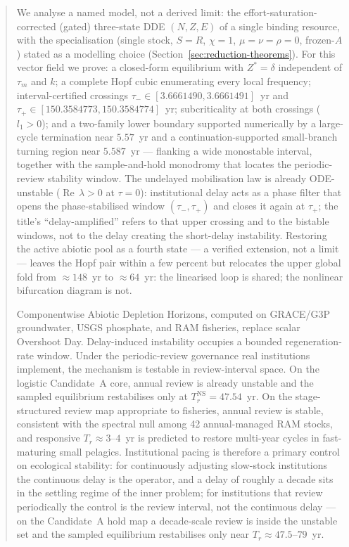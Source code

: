 \documentclass[11pt]{article}
\theoremstyle{definition}
\begin{document}
\begin{abstract}
We analyse a named model, not a derived limit: the effort-saturation-corrected (gated) three-state DDE $(N,Z,E)$ of a single binding resource, with the specialisation (single stock, $S=R$, $\chi=1$, $\mu=\nu=\rho=0$, frozen-$A$) stated as a modelling choice (Section~\ref{sec:reduction-theorems}). For this vector field we prove: a closed-form equilibrium with $Z^*=\delta$ independent of $\tau_m$ and $k$; a complete Hopf cubic enumerating every local frequency; interval-certified crossings $\tau_-\in[3.6661490,3.6661491]$~yr and $\tau_+\in[150.3584773,150.3584774]$~yr; subcriticality at both crossings ($l_1>0$); and a two-family lower boundary supported numerically by a large-cycle termination near $5.57$~yr and a continuation-supported small-branch turning region near $5.587$~yr --- flanking a wide monostable interval, together with the sample-and-hold monodromy that locates the periodic-review stability window. The undelayed mobilisation law is already ODE-unstable ($\operatorname{Re}\,\lambda>0$ at $\tau=0$): institutional delay acts as a phase filter that opens the phase-stabilised window $(\tau_-,\tau_+)$ and closes it again at $\tau_+$; the title's ``delay-amplified'' refers to that upper crossing and to the bistable windows, not to the delay creating the short-delay instability. Restoring the active abiotic pool as a fourth state --- a verified extension, not a limit --- leaves the Hopf pair within a few percent but relocates the upper global fold from $\approx 148$~yr to $\approx 64$~yr: the linearised loop is shared; the nonlinear bifurcation diagram is not.

Componentwise Abiotic Depletion Horizons, computed on GRACE/G3P groundwater, USGS phosphate, and RAM fisheries, replace scalar Overshoot Day. Delay-induced instability occupies a bounded regeneration-rate window. Under the periodic-review governance real institutions implement, the mechanism is testable in review-interval space. On the logistic Candidate~A core, annual review is already unstable and the sampled equilibrium restabilises only at $T_r^{\mathrm{NS}}=47.54$~yr. On the stage-structured review map appropriate to fisheries, annual review is stable, consistent with the spectral null among 42 annual-managed RAM stocks, and responsive $T_r\approx 3$--$4$~yr is predicted to restore multi-year cycles in fast-maturing small pelagics. Institutional pacing is therefore a primary control on ecological stability: for continuously adjusting slow-stock institutions the continuous delay is the operator, and a delay of roughly a decade sits in the settling regime of the inner problem; for institutions that review periodically the control is the review interval, not the continuous delay --- on the Candidate~A hold map a decade-scale review is inside the unstable set and the sampled equilibrium restabilises only near $T_r\approx 47.5$--$79$~yr.
\end{abstract}
\end{document}
